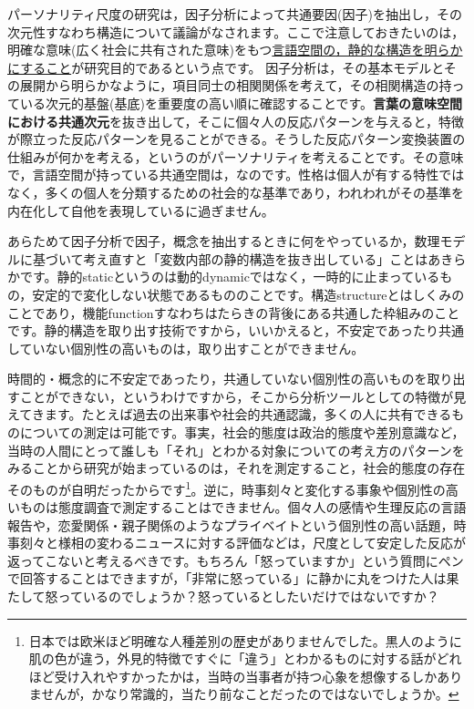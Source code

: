 \documentclass{ltjsbook}
\begin{document}
パーソナリティ尺度の研究は，因子分析によって共通要因(因子)を抽出し，その次元性すなわち構造について議論がなされます。ここで注意しておきたいのは，明確な意味(広く社会に共有された意味)をもつ\underline{言語空間の，静的な構造を明らかにすること}が研究目的であるという点です。
因子分析は，その基本モデルとその展開から明らかなように，項目同士の相関関係を考えて，その相関構造の持っている次元的基盤(基底)を重要度の高い順に確認することです。\textbf{言葉の意味空間における共通次元}を抜き出して，そこに個々人の反応パターンを与えると，特徴が際立った反応パターンを見ることができる。そうした反応パターン変換装置の仕組みが何かを考える，というのがパーソナリティを考えることです。その意味で，言語空間が持っている共通空間は，なのです。性格は個人が有する特性ではなく，多くの個人を分類するための社会的な基準であり，われわれがその基準を内在化して自他を表現しているに過ぎません。

あらためて因子分析で因子，概念を抽出するときに何をやっているか，数理モデルに基づいて考え直すと「変数内部の静的構造を抜き出している」ことはあきらかです。静的staticというのは動的dynamicではなく，一時的に止まっているもの，安定的で変化しない状態であるもののことです。構造structureとはしくみのことであり，機能functionすなわちはたらきの背後にある共通した枠組みのことです。静的構造を取り出す技術ですから，いいかえると，不安定であったり共通していない個別性の高いものは，取り出すことができません。

時間的・概念的に不安定であったり，共通していない個別性の高いものを取り出すことができない，というわけですから，そこから分析ツールとしての特徴が見えてきます。たとえば過去の出来事や社会的共通認識，多くの人に共有できるものについての測定は可能です。事実，社会的態度は政治的態度や差別意識など，当時の人間にとって誰しも「それ」とわかる対象についての考え方のパターンをみることから研究が始まっているのは，それを測定すること，社会的態度の存在そのものが自明だったからです\footnote{日本では欧米ほど明確な人種差別の歴史がありませんでした。黒人のように肌の色が違う，外見的特徴ですぐに「違う」とわかるものに対する話がどれほど受け入れやすかったかは，当時の当事者が持つ心象を想像するしかありませんが，かなり常識的，当たり前なことだったのではないでしょうか。}。逆に，時事刻々と変化する事象や個別性の高いものは態度調査で測定することはできません。個々人の感情や生理反応の言語報告や，恋愛関係・親子関係のようなプライベイトという個別性の高い話題，時事刻々と様相の変わるニュースに対する評価などは，尺度として安定した反応が返ってこないと考えるべきです。もちろん「怒っていますか」という質問にペンで回答することはできますが，「非常に怒っている」に静かに丸をつけた人は果たして怒っているのでしょうか？怒っているとしたいだけではないですか？
\end{document}
